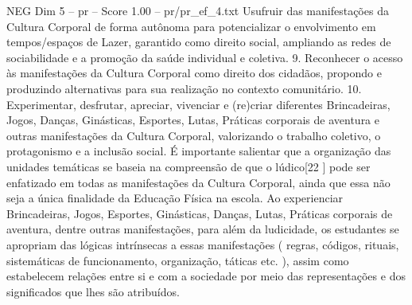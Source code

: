 \begin{textsample}{NEG Dim 5 – pr – Score 1.00 – pr/pr\_ef\_4.txt}
Usufruir das manifestações da Cultura Corporal de forma autônoma para potencializar o envolvimento em tempos/espaços de Lazer, garantido como direito social, ampliando as redes de sociabilidade e a promoção da saúde individual e coletiva. 9.
Reconhecer o acesso às manifestações da Cultura Corporal como direito dos cidadãos, propondo e produzindo alternativas para sua realização no contexto comunitário. 10.
Experimentar, desfrutar, apreciar, vivenciar e (re)criar diferentes Brincadeiras, Jogos, Danças, Ginásticas, Esportes, Lutas, Práticas corporais de aventura e outras manifestações da Cultura Corporal, valorizando o trabalho coletivo, o protagonismo e a inclusão social.
É importante salientar que a organização das unidades temáticas se baseia na compreensão de que o lúdico[22 ] pode ser enfatizado em todas as manifestações da Cultura Corporal, ainda que essa não seja a única finalidade da Educação Física na escola.
Ao experienciar Brincadeiras, Jogos, Esportes, Ginásticas, Danças, Lutas, Práticas corporais de aventura, dentre outras manifestações, para além da ludicidade, os estudantes se apropriam das lógicas intrínsecas a essas manifestações ( regras, códigos, rituais, sistemáticas de funcionamento, organização, táticas etc. ), assim como estabelecem relações entre si e com a sociedade por meio das representações e dos significados que lhes são atribuídos.

\end{textsample}
